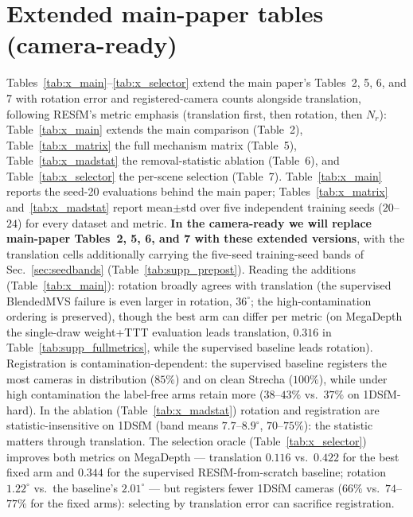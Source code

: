 \documentclass[10pt,twocolumn,letterpaper]{article}
\renewcommand{\deg}{^{\circ}}
\begin{document}
\section{Extended main-paper tables (camera-ready)}\label{sec:extended}
Tables~\ref{tab:x_main}--\ref{tab:x_selector} extend the main paper's Tables~2, 5, 6, and
7 with rotation error and registered-camera counts alongside translation, following
RESfM's metric emphasis (translation first, then rotation, then $N_r$):
Table~\ref{tab:x_main} extends the main comparison (Table~2),
Table~\ref{tab:x_matrix} the full mechanism matrix (Table~5),
Table~\ref{tab:x_madstat} the removal-statistic ablation (Table~6), and
Table~\ref{tab:x_selector} the per-scene selection (Table~7).
Table~\ref{tab:x_main} reports the seed-20 evaluations behind the main paper;
Tables~\ref{tab:x_matrix} and~\ref{tab:x_madstat} report mean$\pm$std over five
independent training seeds ($20$--$24$) for every dataset and metric. \textbf{In the camera-ready we will replace main-paper Tables~2, 5, 6, and 7 with
these extended versions}, with the translation cells additionally carrying the five-seed
training-seed bands of Sec.~\ref{sec:seedbands} (Table~\ref{tab:supp_prepost}). Reading the additions (Table~\ref{tab:x_main}): rotation broadly agrees with translation
(the supervised BlendedMVS failure is even larger in rotation, $36\deg$; the
high-contamination ordering is preserved), though the best arm can differ per metric (on MegaDepth the single-draw weight+TTT
evaluation leads translation, $0.316$ in Table~\ref{tab:supp_fullmetrics}, while the
supervised baseline leads rotation).
Registration is contamination-dependent: the supervised baseline registers the most
cameras in distribution ($85\%$) and on clean Strecha ($100\%$), while under high
contamination the label-free arms retain more ($38$--$43\%$ vs.\ $37\%$ on 1DSfM-hard).
In the ablation (Table~\ref{tab:x_madstat}) rotation and registration are
statistic-insensitive on 1DSfM (band means $7.7$--$8.9\deg$, $70$--$75\%$): the statistic
matters through translation. The selection oracle (Table~\ref{tab:x_selector}) improves both metrics on MegaDepth
--- translation $0.116$ vs.\ $0.422$ for the best fixed arm and $0.344$ for the
supervised RESfM-from-scratch baseline; rotation $1.22\deg$ vs.\ the baseline's
$2.01\deg$ --- but registers fewer 1DSfM cameras ($66\%$ vs.\ $74$--$77\%$ for the
fixed arms): selecting by translation error can sacrifice registration.
\end{document}
